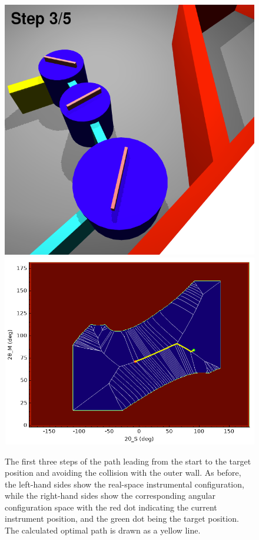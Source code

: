 \begin{figure}[htb]
\begin{center}
			\vspace{0.2cm}
			\includegraphics[width = 0.4 \textwidth]{figures/casestudy_step2}
			\hspace{0.5cm}
			\includegraphics[width = 0.55 \textwidth]{figures/casestudy_step2_cfg}
		\end{center}
	\caption[Case study: Path 1/2.]{The first three steps of the path leading from the start
		to the target position and avoiding the collision with the outer wall. As before, the
		left-hand sides show the real-space instrumental configuration, while the right-hand
		sides show the corresponding angular configuration space with the red dot indicating the
		current instrument position, and the green dot being the target position.
		The calculated optimal path is drawn as a yellow line.
		\label{fig:casestudy_sequence1}}
\end{figure}

